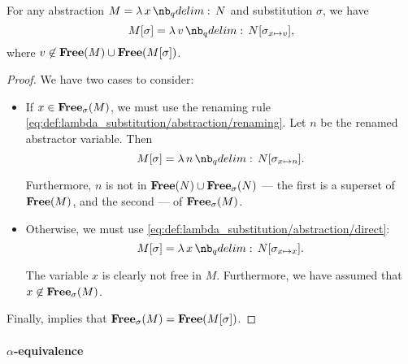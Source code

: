 \begin{proposition}\label{thm:lambda_substitution_single_rule}
  For any abstraction \( M = \qabs x N \) and substitution \( \sigma \), we have
  \begin{equation}\label{eq:thm:lambda_substitution_single_rule}
    M[\sigma] = \qabs v N[\sigma_{x \mapsto v}],
  \end{equation}
  where \( v \not\in \op*{Free}(M) \cup \op*{Free}(M[\sigma]) \).
\end{proposition}
\begin{proof}
  We have two cases to consider:
  \begin{itemize}
    \item If \( x \in \op*{Free}_\sigma(M) \), we must use the renaming rule \eqref{eq:def:lambda_substitution/abstraction/renaming}. Let \( n \) be the renamed abstractor variable. Then
    \begin{equation*}
      M[\sigma] = \qabs n N[\sigma_{x \mapsto n}].
    \end{equation*}

    Furthermore, \( n \) is not in \( \op*{Free}(N) \cup \op*{Free}_\sigma(N) \) --- the first is a superset of \( \op*{Free}(M) \), and the second --- of \( \op*{Free}_\sigma(M) \).

    \item Otherwise, we must use \eqref{eq:def:lambda_substitution/abstraction/direct}:
    \begin{equation*}
      M[\sigma] = \qabs x N[\sigma_{x \mapsto x}].
    \end{equation*}

    The variable \( x \) is clearly not free in \( M \). Furthermore, we have assumed that \( x \not\in \op*{Free}_\sigma(M) \).
  \end{itemize}

  Finally,  implies that \( \op*{Free}_\sigma(M) = \op*{Free}(M[\sigma]) \).
\end{proof}

\paragraph{\( \alpha \)-equivalence}

